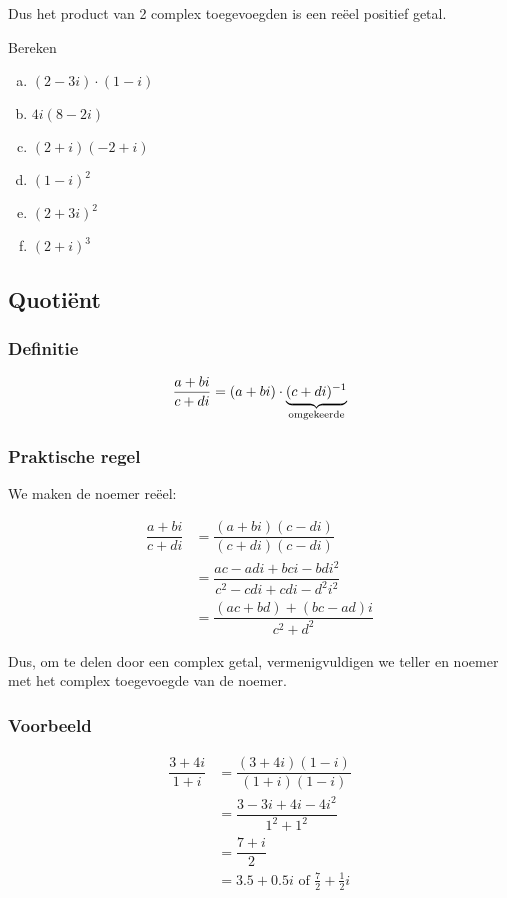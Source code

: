 \documentclass[12pt,twoside,a4]{article}
\begin{document}
Dus het product van 2 complex toegevoegden is een reëel positief getal.


\begin{oefening}
  Bereken
  \begin{multicols}{2}
  \begin{enumerate}[(a)]
  \itemsep1em
  \item $\displaystyle (2-3i)\cdot (1-i)$
  \item $\displaystyle 4i(8-2i)$
  \item $\displaystyle (2+i)(-2+i)$
  \item $\displaystyle (1-i)^2$
  \item $\displaystyle (2+3i)^2$
  \item $\displaystyle (2+i)^3$
  \end{enumerate}
  \end{multicols}
\end{oefening}

\subsection{Quotiënt}

\subsubsection*{Definitie}
\begin{mdframed}
$$\dfrac{a+bi}{c+di} = (a+bi)\cdot\underbrace{(c+di)^{-1}}_{\mbox{\scriptsize omgekeerde}}$$
\end{mdframed}

\subsubsection*{Praktische regel}

We maken de noemer reëel:

\begin{align*}
  \dfrac{a+bi}{c+di} &= \dfrac{(a+bi)(c-di)}{(c+di)(c-di)} \\
                     &= \dfrac{ac-adi + bci - bdi^2}{c^2 - cdi + cdi -d^2i^2}\\
                     &= \dfrac{(ac + bd) + (bc -ad)i}{c^2 + d^2}
\end{align*}

Dus, om te delen door een complex getal, vermenigvuldigen we teller en noemer met het complex toegevoegde van de noemer.

\subsubsection*{Voorbeeld}
\begin{align*}
  \dfrac{3+4i}{1+i} &= \dfrac{(3+4i)(1-i)}{(1+i)(1-i)} \\
                    &= \dfrac{3-3i + 4i - 4i^2}{1^2 + 1^2}\\
                    &= \dfrac{7 + i}{2}\\
                    &= 3.5 + 0.5i \mbox{ of } \frac{7}{2} + \frac{1}{2}i
\end{align*}
\end{document}
